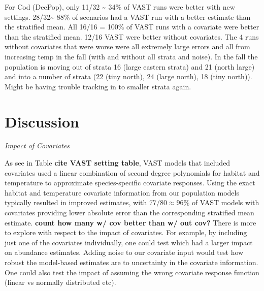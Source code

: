 \documentclass[
  12pt,
]{article}
\begin{document}
For Cod (DecPop), only 11/32 \textasciitilde{} 34\% of VAST runs were better with new settings. 28/32\textasciitilde{} 88\% of scenarios had a VAST run with a better estimate than the stratified mean. All 16/16 = 100\% of VAST runs with a covariate were better than the stratified mean. 12/16 VAST were better without covariates. The 4 runs without covariates that were worse were all extremely large errors and all from increasing temp in the fall (with and without all strata and noise). In the fall the population is moving out of strata 16 (large eastern strata) and 21 (north large) and into a number of strata (22 (tiny north), 24 (large north), 18 (tiny north)). Might be having trouble tracking in to smaller strata again.

\section{Discussion}

\emph{Impact of Covariates}

As see in Table \textbf{cite VAST setting table}, VAST models that included covariates used a linear combination of second degree polynomials for habitat and temperature to approximate species-specific covariate responses. Using the exact habitat and temperature covariate information from our population models typically resulted in improved estimates, with \(77/80\approx 96\%\) of VAST models with covariates providing lower absolute error than the corresponding stratified mean estimate. \textbf{count how many w/ cov better than w/ out cov?} There is more to explore with respect to the impact of covariates. For example, by including just one of the covariates individually, one could test which had a larger impact on abundance estimates. Adding noise to our covariate input would test how robust the model-based estimates are to uncertainty in the covariate information. One could also test the impact of assuming the wrong covariate response function (linear vs normally distributed etc).
\end{document}
